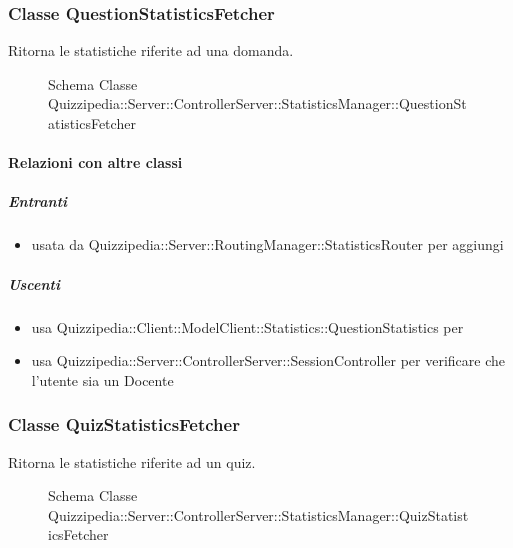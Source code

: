 \subsubsection{Classe QuestionStatisticsFetcher}
Ritorna le statistiche riferite ad una domanda.
\begin{figure}[H]
\centering
\noindent{}
\caption[Schema Classe QuestionStatisticsFetcher]{Schema Classe Quizzipedia::Server::ControllerServer::StatisticsManager::QuestionStatisticsFetcher}
\end{figure}
\paragraph{Relazioni con altre classi}
\subparagraph{Entranti}
\begin{itemize}
\item usata da Quizzipedia::Server::RoutingManager::StatisticsRouter per aggiungi
\end{itemize}
\subparagraph{Uscenti}
\begin{itemize}
\item usa Quizzipedia::Client::ModelClient::Statistics::QuestionStatistics per 
\item usa Quizzipedia::Server::ControllerServer::SessionController per verificare che l'utente sia un Docente
\end{itemize}
\subsubsection{Classe QuizStatisticsFetcher}
Ritorna le statistiche riferite ad un quiz.
\begin{figure}[H]
\centering
\noindent{}
\caption[Schema Classe QuizStatisticsFetcher]{Schema Classe Quizzipedia::Server::ControllerServer::StatisticsManager::QuizStatisticsFetcher}
\end{figure}
